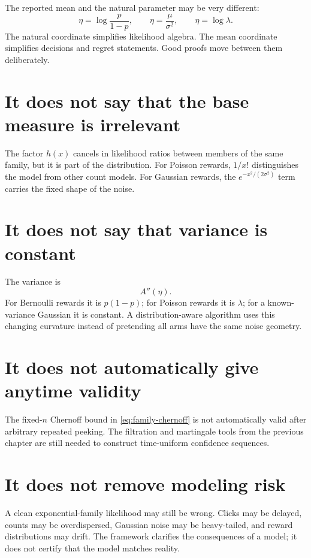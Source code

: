 \documentclass[en,nofont,11pt]{elegantbook}
\begin{document}
The reported mean and the natural parameter may be very different:
\[
\eta=\log\frac{p}{1-p},
\qquad
\eta=\frac{\mu}{\sigma^2},
\qquad
\eta=\log\lambda.
\]
The natural coordinate simplifies likelihood algebra. The mean coordinate simplifies decisions and regret statements. Good proofs move between them deliberately.

\section{It does not say that the base measure is irrelevant}

The factor $h(x)$ cancels in likelihood ratios between members of the same family, but it is part of the distribution. For Poisson rewards, $1/x!$ distinguishes the model from other count models. For Gaussian rewards, the $e^{-x^2/(2\sigma^2)}$ term carries the fixed shape of the noise.

\section{It does not say that variance is constant}

The variance is
\[
A''(\eta).
\]
For Bernoulli rewards it is $p(1-p)$; for Poisson rewards it is $\lambda$; for a known-variance Gaussian it is constant. A distribution-aware algorithm uses this changing curvature instead of pretending all arms have the same noise geometry.

\section{It does not automatically give anytime validity}

The fixed-$n$ Chernoff bound in \eqref{eq:family-chernoff} is not automatically valid after arbitrary repeated peeking. The filtration and martingale tools from the previous chapter are still needed to construct time-uniform confidence sequences.

\section{It does not remove modeling risk}

A clean exponential-family likelihood may still be wrong. Clicks may be delayed, counts may be overdispersed, Gaussian noise may be heavy-tailed, and reward distributions may drift. The framework clarifies the consequences of a model; it does not certify that the model matches reality.
\end{document}
